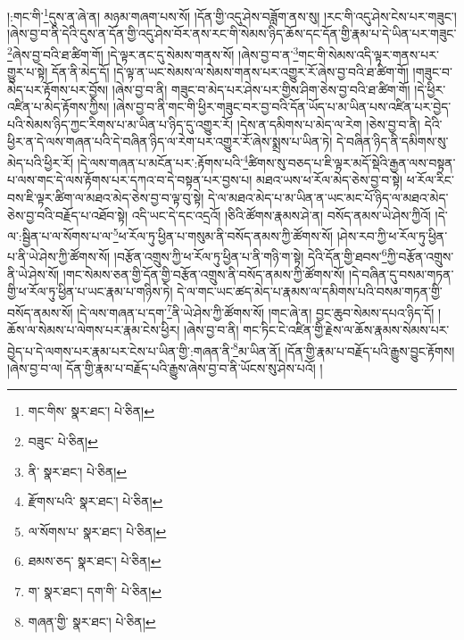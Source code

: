 །:གང་གི་\footnote{གང་གིས་  སྣར་ཐང་།  པེ་ཅིན། }དུས་ན་ཞེ་ན། མཉམ་གཞག་པས་སོ། །དོན་གྱི་འདུ་ཤེས་བཟློག་ནས་སུ། །རང་གི་འདུ་ཤེས་ངེས་པར་གཟུང་། །ཞེས་བྱ་བ་ནི་དེའི་དུས་ན་དོན་གྱི་འདུ་ཤེས་བོར་ནས་རང་གི་སེམས་ཉིད་ཆོས་དང་དོན་གྱི་རྣམ་པ་དེ་ཡིན་པར་གཟུང་\footnote{བཟུང་  པེ་ཅིན། }ཞེས་བྱ་བའི་ཐ་ཚིག་གོ། །དེ་ལྟར་ནང་དུ་སེམས་གནས་སོ། །ཞེས་བྱ་བ་ན་\footnote{ནི་  སྣར་ཐང་།  པེ་ཅིན། }གང་གི་སེམས་འདི་ལྟར་གནས་པར་གྱུར་པ་སྟེ། དོན་ནི་མེད་དོ། །དེ་ལྟ་ན་ཡང་སེམས་ལ་སེམས་གནས་པར་འགྱུར་རོ་ཞེས་བྱ་བའི་ཐ་ཚིག་གོ། །གཟུང་བ་མེད་པར་རྟོགས་པར་བྱོས། །ཞེས་བྱ་བ་ནི། གཟུང་བ་མེད་པར་ཤེས་པར་གྱིས་ཤིག་ཅེས་བྱ་བའི་ཐ་ཚིག་གོ། །དེ་ཕྱིར་འཛིན་པ་མེད་རྟོགས་ཀྱིས། །ཞེས་བྱ་བ་ནི་གང་གི་ཕྱིར་གཟུང་བར་བྱ་བའི་དོན་ཡོད་པ་མ་ཡིན་པས་འཛིན་པར་བྱེད་པའི་སེམས་ཉིད་ཀྱང་རིགས་པ་མ་ཡིན་པ་ཉིད་དུ་འགྱུར་རོ། །དེས་ན་དམིགས་པ་མེད་ལ་རེག །ཅེས་བྱ་བ་ནི། དེའི་ཕྱིར་ན་དེ་ལས་གཞན་པའི་དེ་བཞིན་ཉིད་ལ་རེག་པར་འགྱུར་རོ་ཞེས་སྨྲས་པ་ཡིན་ཏེ། དེ་བཞིན་ཉིད་ནི་དམིགས་སུ་མེད་པའི་ཕྱིར་རོ། །དེ་ལས་གཞན་པ་མངོན་པར་:རྟོགས་པའི་\footnote{རྫོགས་པའི་  སྣར་ཐང་།  པེ་ཅིན། }ཚིགས་སུ་བཅད་པ་ཇི་ལྟར་མདོ་སྡེའི་རྒྱན་ལས་བསྟན་པ་ལས་གང་དེ་ལས་རྟོགས་པར་དཀའ་བ་དེ་བསྟན་པར་བྱས་པ། མཐའ་ཡས་ཕ་རོལ་མེད་ཅེས་བྱ་བ་སྟེ། ཕ་རོལ་རིང་བས་ཇི་ལྟར་ཚིག་ལ་མཐའ་མེད་ཅེས་བྱ་བ་ལྟ་བུ་སྟེ། དེ་ལ་མཐའ་མེད་པ་མ་ཡིན་ན་ཡང་མང་པོ་ཉིད་ལ་མཐའ་མེད་ཅེས་བྱ་བའི་བརྗོད་པ་འཐོབ་སྟེ། འདི་ཡང་དེ་དང་འདྲའོ། །ཅིའི་ཚོགས་རྣམས་ཤེ་ན། བསོད་ནམས་ཡེ་ཤེས་ཀྱིའོ། །དེ་ལ་:སྦྱིན་པ་ལ་སོགས་པ་ལ་\footnote{ལ་སོགས་པ་  སྣར་ཐང་།  པེ་ཅིན། }ཕ་རོལ་ཏུ་ཕྱིན་པ་གསུམ་ནི་བསོད་ནམས་ཀྱི་ཚོགས་སོ། །ཤེས་རབ་ཀྱི་ཕ་རོལ་ཏུ་ཕྱིན་པ་ནི་ཡེ་ཤེས་ཀྱི་ཚོགས་སོ། །བརྩོན་འགྲུས་ཀྱི་ཕ་རོལ་ཏུ་ཕྱིན་པ་ནི་གཉི་ག་སྟེ། དེའི་དོན་གྱི་ཐབས་\footnote{ཐམས་ཅད་  སྣར་ཐང་།  པེ་ཅིན། }ཀྱི་བརྩོན་འགྲུས་ནི་ཡེ་ཤེས་སོ། །གང་སེམས་ཅན་གྱི་དོན་གྱི་བརྩོན་འགྲུས་ནི་བསོད་ནམས་ཀྱི་ཚོགས་སོ། །དེ་བཞིན་དུ་བསམ་གཏན་གྱི་ཕ་རོལ་ཏུ་ཕྱིན་པ་ཡང་རྣམ་པ་གཉིས་ཏེ། དེ་ལ་གང་ཡང་ཚད་མེད་པ་རྣམས་ལ་དམིགས་པའི་བསམ་གཏན་གྱི་བསོད་ནམས་སོ། །དེ་ལས་གཞན་པ་དག་\footnote{ག་  སྣར་ཐང་། དག་གི་  པེ་ཅིན། }ནི་ཡེ་ཤེས་ཀྱི་ཚོགས་སོ། །གང་ཞེ་ན། བྱང་ཆུབ་སེམས་དཔའ་ཉིད་དོ། །ཆོས་ལ་སེམས་པ་ལེགས་པར་རྣམ་ངེས་ཕྱིར། །ཞེས་བྱ་བ་ནི། གང་ཏིང་ངེ་འཛིན་གྱི་རྗེས་ལ་ཆོས་རྣམས་སེམས་པར་བྱེད་པ་དེ་ལགས་པར་རྣམ་པར་ངེས་པ་ཡིན་གྱི་:གཞན་ནི་\footnote{གཞན་གྱི་  སྣར་ཐང་།  པེ་ཅིན། }མ་ཡིན་ནོ། །དོན་གྱི་རྣམ་པ་བརྗོད་པའི་རྒྱུས་བྱུང་རྟོགས། །ཞེས་བྱ་བ་ལ། དོན་གྱི་རྣམ་པ་བརྗོད་པའི་རྒྱུས་ཞེས་བྱ་བ་ནི་ཡོངས་སུ་ཤེས་པའོ། །
